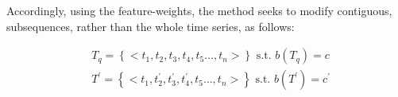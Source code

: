 Accordingly, using the feature-weights, the method seeks to modify contiguous, subsequences, rather than the whole time series, as follows:

$$
\begin{aligned}
& T_{q}=\left\{<t_{1}, t_{2}, t_{3}, t_{4}, t_{5} \ldots, t_{n}>\right\} \text { s.t. } b\left(T_{q}\right)=c \\
& T^{\prime}=\left\{<t_{1}, t_{2}^{\prime}, t_{3}^{\prime}, t_{4}^{\prime}, t_{5} \ldots, t_{n}>\right\} \text { s.t. } b\left(T^{\prime}\right)=c^{\prime}
\end{aligned}
$$




